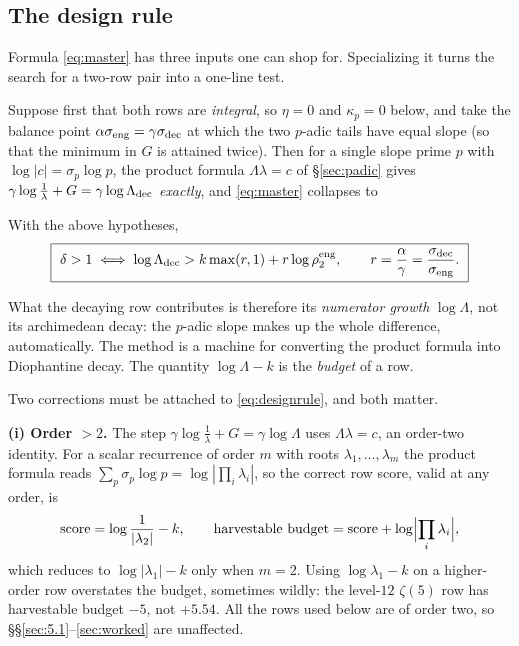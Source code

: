 \subsection{The design rule}\label{sec:designrule}

Formula \eqref{eq:master} has three inputs one can shop for.  Specializing it
turns the search for a two-row pair into a one-line test.

Suppose first that both rows are \emph{integral}, so $\eta=0$ and
$\kappa_p=0$ below, and take the balance point
$\alpha\sigma_{\rm eng}=\gamma\sigma_{\rm dec}$ at which the two $p$-adic
tails have equal slope (so that the minimum in $G$ is attained twice).  Then
for a single slope prime $p$ with $\log|c|=\sigma_p\log p$, the product formula
$\Lambda\lambda=c$ of \S\ref{sec:padic} gives
$\gamma\log\tfrac1\lambda+G=\gamma\log\Lambda_{\rm dec}$ \emph{exactly}, and
\eqref{eq:master} collapses to

\begin{proposition}\label{prop:design}
\Proved{} With the above hypotheses,
\begin{equation}\label{eq:designrule}
\boxed{\ \delta>1
\iff \log\Lambda_{\rm dec}>k\max(r,1)+r\log\rho_2^{\rm eng},
\qquad r=\frac{\alpha}{\gamma}=\frac{\sigma_{\rm dec}}{\sigma_{\rm eng}} .\ }
\end{equation}
\end{proposition}

What the decaying row contributes is therefore its \emph{numerator growth}
$\log\Lambda$, not its archimedean decay: the $p$-adic slope makes up the whole
difference, automatically.  The method is a machine for converting the product
formula into Diophantine decay.  The quantity $\log\Lambda-k$ is the
\emph{budget} of a row.

Two corrections must be attached to \eqref{eq:designrule}, and both matter.

\medskip
\noindent\textbf{(i) Order $>2$.}  The step
$\gamma\log\tfrac1\lambda+G=\gamma\log\Lambda$ uses
$\Lambda\lambda=c$, an order-two identity.  For a scalar recurrence of order
$m$ with roots $\lambda_1,\dots,\lambda_m$ the product formula reads
$\sum_p\sigma_p\log p=\log|\prod_i\lambda_i|$, so the correct row score, valid
at any order, is
\begin{equation}\label{eq:orderm}
\text{score}=\log\frac1{|\lambda_2|}-k,\qquad
\text{harvestable budget}=\text{score}+\log\Bigl|\prod_i\lambda_i\Bigr|,
\end{equation}
which reduces to $\log|\lambda_1|-k$ only when $m=2$.  Using $\log\lambda_1-k$
on a higher-order row overstates the budget, sometimes wildly: the level-$12$
$\zeta(5)$ row has harvestable budget $-5$, not $+5.54$.  All the rows used
below are of order two, so \S\S\ref{sec:5.1}--\ref{sec:worked} are unaffected.

